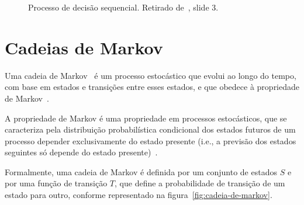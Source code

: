 \begin{figure}[H]
    \begin{center}
    \end{center}
    \caption{Processo de decisão sequencial.
    Retirado de~\cite{isel:iasa:slides:processos-decisao-sequencial}, slide 3.}
    \label{fig:processo-decisao-sequencial}
\end{figure}


\section{Cadeias de Markov}\label{sec:cadeias-de-markov}

Uma cadeia de Markov~\cite{wiki:markov-chain} é um processo estocástico que evolui ao longo do tempo, com
base em estados e transições entre esses estados, e que obedece à propriedade de Markov~\cite{isel:iasa:slides:processos-decisao-sequencial}.

A propriedade de Markov é uma propriedade em processos estocásticos, que se caracteriza pela distribuição probabilística condicional dos estados futuros de um processo depender exclusivamente do estado presente (i.e., a previsão dos estados seguintes só depende do estado presente)~\cite{isel:iasa:slides:processos-decisao-sequencial}.

Formalmente, uma cadeia de Markov é definida por um conjunto de estados $S$ e por uma função de transição $T$, que define a probabilidade de transição de um estado para outro,
conforme representado na figura~\ref{fig:cadeia-de-markov}.

